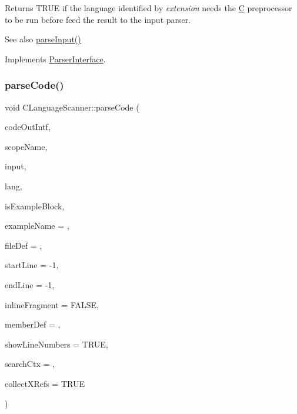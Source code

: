Returns T\+R\+UE if the language identified by {\itshape extension} needs the \mbox{\hyperlink{class_c}{C}} preprocessor to be run before feed the result to the input parser. \begin{DoxySeeAlso}{See also}
\mbox{\hyperlink{class_c_language_scanner_a0a92c2f77d7b78987e8dad149a2f4171}{parse\+Input()}} 
\end{DoxySeeAlso}


Implements \mbox{\hyperlink{class_parser_interface_a36c669b17b64a6e3847f27d70a5398d2}{Parser\+Interface}}.

\mbox{\label{class_c_language_scanner_a1d8d53789892f16d48fc90878d825f76}} 
\subsubsection{\texorpdfstring{parseCode()}{parseCode()}}
{\footnotesize\ttfamily void C\+Language\+Scanner\+::parse\+Code (\begin{DoxyParamCaption}\item[{\mbox{\hyperlink{class_code_output_interface}{Code\+Output\+Interface}} \&}]{code\+Out\+Intf,  }\item[{const char $\ast$}]{scope\+Name,  }\item[{const \mbox{\hyperlink{class_q_c_string}{Q\+C\+String}} \&}]{input,  }\item[{\mbox{\hyperlink{types_8h_a9974623ce72fc23df5d64426b9178bf2}{Src\+Lang\+Ext}}}]{lang,  }\item[{bool}]{is\+Example\+Block,  }\item[{const char $\ast$}]{example\+Name = {},  }\item[{\mbox{\hyperlink{class_file_def}{File\+Def}} $\ast$}]{file\+Def = {},  }\item[{int}]{start\+Line = {\ttfamily -\/1},  }\item[{int}]{end\+Line = {\ttfamily -\/1},  }\item[{bool}]{inline\+Fragment = {\ttfamily FALSE},  }\item[{\mbox{\hyperlink{class_member_def}{Member\+Def}} $\ast$}]{member\+Def = {},  }\item[{bool}]{show\+Line\+Numbers = {\ttfamily TRUE},  }\item[{\mbox{\hyperlink{class_definition}{Definition}} $\ast$}]{search\+Ctx = {},  }\item[{bool}]{collect\+X\+Refs = {\ttfamily TRUE} }\end{DoxyParamCaption})\hspace{0.3cm}{\ttfamily [virtual]}}

